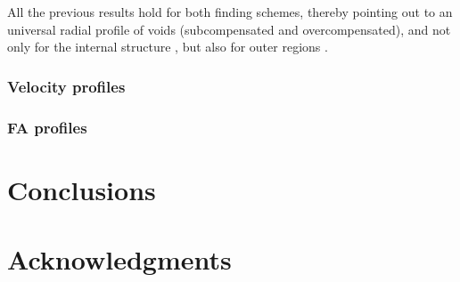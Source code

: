 \documentclass[a4,useAMS,usenatbib,usegraphicx]{latex/mn2e}
\begin{document}
All the previous results hold for both finding schemes, thereby pointing 
out to an universal radial profile of voids (subcompensated and 
overcompensated), and not only for the internal structure \citep{Colberg05, 
Ricciardelli2013}, but also for outer regions \citep{Lavaux12, Hamaus14}.


\subsubsection{Velocity profiles}
\label{subsubsec:velocity_voids}

\subsubsection{FA profiles}
\label{subsubsec:FA_voids}


\section{Conclusions}
\label{sec:conclusions}


\section*{Acknowledgments}  






  


\end{document}
